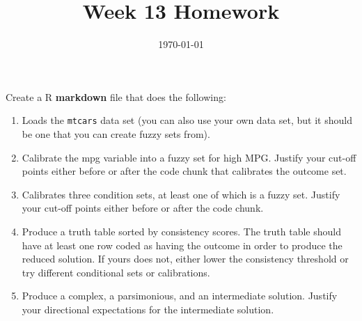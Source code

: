 \documentclass[12pt, oneside]{article}   	%
\title{Week 13 Homework}
\date{\today}							%
\begin{document}
\maketitle

Create a R \textbf{markdown} file that does the following:

\begin{enumerate}
\item Loads the \texttt{mtcars} data set (you can also use your own data set, but it should be one that you can create fuzzy sets from).
\item Calibrate the mpg variable into a fuzzy set for high MPG. Justify your cut-off points either before or after the code chunk that calibrates the outcome set.
\item Calibrates three condition sets, at least one of which is a fuzzy set. Justify your cut-off points either before or after the code chunk.
\item Produce a truth table sorted by consistency scores. The truth table should have at least one row coded as having the outcome in order to produce the reduced solution. If yours does not, either lower the consistency threshold or try different conditional sets or calibrations.
\item Produce a complex, a parsimonious, and an intermediate solution. Justify your directional expectations for the intermediate solution.
\end{enumerate}
\end{document}

